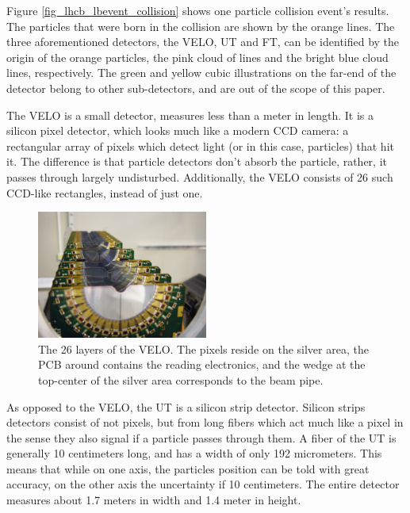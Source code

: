 \documentclass[12pt]{article}
\begin{document}
Figure \ref{fig_lhcb_lbevent_collision} shows one particle collision event's results. The particles that were born in the collision are shown by the orange lines. The three aforementioned detectors, the VELO, UT and FT, can be identified by the origin of the orange particles, the pink cloud of lines and the bright blue cloud lines, respectively. The green and yellow cubic illustrations on the far-end of the detector belong to other sub-detectors, and are out of the scope of this paper.

The VELO is a small detector, measures less than a meter in length. It is a silicon pixel detector, which looks much like a modern CCD camera: a rectangular array of pixels which detect light (or in this case, particles) that hit it. The difference is that particle detectors don't absorb the particle, rather, it passes through largely undisturbed. Additionally, the VELO consists of 26 such CCD-like rectangles, instead of just one.

\begin{figure}[H]
	\begin{center}
		\includegraphics[width=0.5\textwidth]{detector_velo_real}
	\end{center}
	\caption{The 26 layers of the VELO. The pixels reside on the silver area, the PCB around contains the reading electronics, and the wedge at the top-center of the silver area corresponds to the beam pipe.}
	\label{fig_detector_velo_real}
\end{figure}

As opposed to the VELO, the UT is a silicon strip detector. Silicon strips detectors consist of not pixels, but from long fibers which act much like a pixel in the sense they also signal if a particle passes through them. A fiber of the UT is generally 10 centimeters long, and has a width of only 192 micrometers. This means that while on one axis, the particles position can be told with great accuracy, on the other axis the uncertainty if 10 centimeters. The entire detector measures about 1.7 meters in width and 1.4 meter in height.
\end{document}
